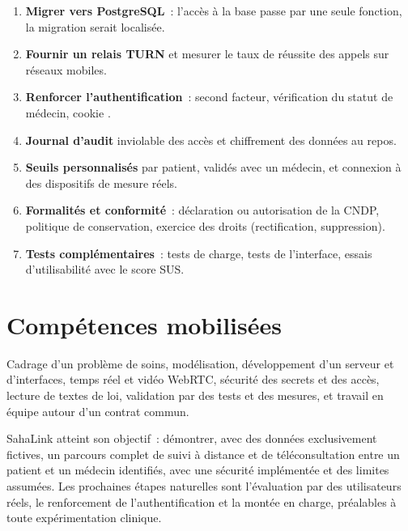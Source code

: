 \begin{enumerate}
  \item \textbf{Migrer vers PostgreSQL}~: l'accès à la base passe par une seule fonction, la migration serait localisée.
  \item \textbf{Fournir un relais \ac{TURN}} et mesurer le taux de réussite des appels sur réseaux mobiles.
  \item \textbf{Renforcer l'authentification}~: second facteur, vérification du statut de médecin, cookie .
  \item \textbf{Journal d'audit} inviolable des accès et chiffrement des données au repos.
  \item \textbf{Seuils personnalisés} par patient, validés avec un médecin, et connexion à des dispositifs de mesure réels.
  \item \textbf{Formalités et conformité}~: déclaration ou autorisation de la \ac{CNDP}, politique de conservation, exercice des droits (rectification, suppression).
  \item \textbf{Tests complémentaires}~: tests de charge, tests de l'interface, essais d'utilisabilité avec le score \ac{SUS}.
\end{enumerate}

\section{Compétences mobilisées}

Cadrage d'un problème de soins, modélisation, développement d'un serveur et d'interfaces, temps réel et vidéo WebRTC, sécurité des secrets et des accès, lecture de textes de loi, validation par des tests et des mesures, et travail en équipe autour d'un contrat commun.

\conclchap

SahaLink atteint son objectif~: démontrer, avec des données exclusivement fictives, un parcours complet de suivi à distance et de téléconsultation entre un patient et un médecin identifiés, avec une sécurité implémentée et des limites assumées. Les prochaines étapes naturelles sont l'évaluation par des utilisateurs réels, le renforcement de l'authentification et la montée en charge, préalables à toute expérimentation clinique.
